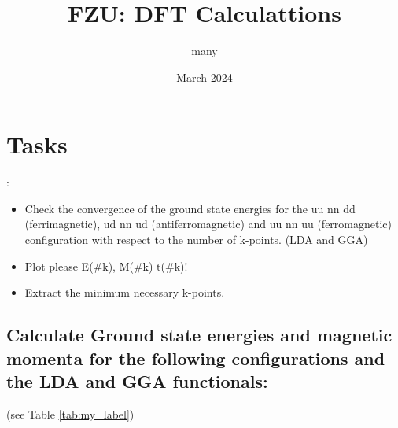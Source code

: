 \documentclass{article}
\title{FZU: DFT Calculattions}
\author{many}
\date{March 2024}
\begin{document}
\maketitle

\section{Tasks }:


\begin{itemize}
    \item Check the convergence of the ground state energies for the uu nn dd (ferrimagnetic), ud nn ud (antiferromagnetic)  and uu nn uu (ferromagnetic) configuration with respect to the number of k-points. (LDA and GGA)
    \item Plot please E(\#k), M(\#k)  t(\#k)!
    \item Extract the minimum necessary k-points.
\end{itemize}




\subsection{Calculate Ground state energies and magnetic momenta for the following
    configurations and the LDA and GGA functionals:}
(see Table \ref{tab:my_label})
\end{document}
